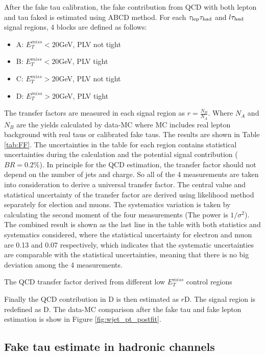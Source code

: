 After the fake tau calibration, the fake contribution from QCD with both lepton and tau faked is estimated using ABCD method. For each $\tau_\text{lep}{}\tau_\text{had}$ and $l\tau_\text{had}$ signal regions, 4 blocks are defined as follows:

\begin{itemize}
	\item A: $E_T^{miss}<20$GeV, PLV not tight
	\item B: $E_T^{miss}<20$GeV, PLV tight
	\item C: $E_T^{miss}>20$GeV, PLV not tight
	\item D: $E_T^{miss}>20$GeV, PLV tight
\end{itemize}
The transfer factors are measured in each signal region as $r=\frac{N_B}{N_A}$. Where $N_A$ and $N_B$ are the yields calculated by data-MC where MC includes real lepton background with real taus or calibrated fake taus. The results are shown in Table \ref{tab:FF}. The uncertainties in the table for each region contains statistical uncertainties during the calculation and the potential signal contribution ($BR=0.2\%$). In principle for the QCD estimation, the transfer factor should not depend on the number of jets and charge. So all of the 4 measurements are taken into consideration to derive a universal transfer factor. The central value and statistical uncertainty of the transfer factor are derived using likelihood method separately for election and muons. The systematics variation is taken by calculating the second moment of the four measurements (The power is $1/\sigma^2$). The combined result is shown as the last line in the table with both statistics and systematics considered, where the statistical uncertainty for electron and muon are 0.13 and 0.07 respectively, which indicates that the systematic uncertainties are comparable with the statistical uncertainties, meaning that there is no big deviation among the 4 measurements.

\begin{table}
\caption{The QCD transfer factor derived from different low $E_T^{miss}$ control regions}
\label{tab:FF}

\end{table}

Finally the QCD contribution in D is then estimated as $r$D. The signal region is redefined as D.
The data-MC comparison after the fake tau and fake lepton estimation is show in Figure \ref{fig:wjet_pt_postfit}.


\subsection{Fake tau estimate in hadronic channels}
\label{sec:ss_method}

